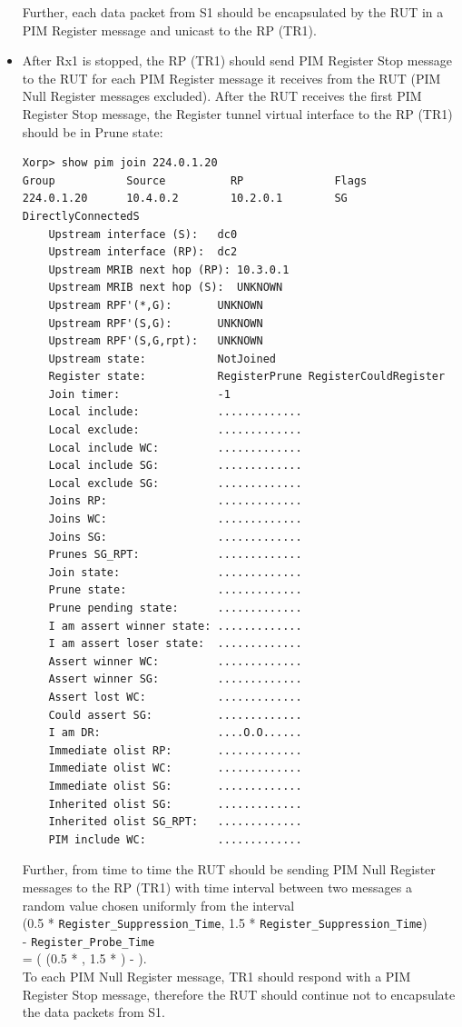 \documentclass[11pt]{report}
\begin{document}
\begin{itemize}
  Further, each data packet from S1 should be encapsulated by the RUT in a
  PIM Register message and unicast to the RP (TR1).

  \item After Rx1 is stopped, the RP (TR1) should send PIM Register Stop
  message to the RUT for each PIM Register message it receives from the RUT
  (PIM Null Register messages excluded). After the RUT receives the first
  PIM Register Stop message, the Register tunnel virtual interface to the RP
  (TR1) should be in Prune state:

\begin{verbatim}
Xorp> show pim join 224.0.1.20
Group           Source          RP              Flags
224.0.1.20      10.4.0.2        10.2.0.1        SG DirectlyConnectedS 
    Upstream interface (S):   dc0
    Upstream interface (RP):  dc2
    Upstream MRIB next hop (RP): 10.3.0.1
    Upstream MRIB next hop (S):  UNKNOWN
    Upstream RPF'(*,G):       UNKNOWN
    Upstream RPF'(S,G):       UNKNOWN
    Upstream RPF'(S,G,rpt):   UNKNOWN
    Upstream state:           NotJoined 
    Register state:           RegisterPrune RegisterCouldRegister 
    Join timer:               -1
    Local include:            .............
    Local exclude:            .............
    Local include WC:         .............
    Local include SG:         .............
    Local exclude SG:         .............
    Joins RP:                 .............
    Joins WC:                 .............
    Joins SG:                 .............
    Prunes SG_RPT:            .............
    Join state:               .............
    Prune state:              .............
    Prune pending state:      .............
    I am assert winner state: .............
    I am assert loser state:  .............
    Assert winner WC:         .............
    Assert winner SG:         .............
    Assert lost WC:           .............
    Could assert SG:          .............
    I am DR:                  ....O.O......
    Immediate olist RP:       .............
    Immediate olist WC:       .............
    Immediate olist SG:       .............
    Inherited olist SG:       .............
    Inherited olist SG_RPT:   .............
    PIM include WC:           .............
\end{verbatim}

  Further, from time to time the RUT should be sending PIM Null Register
  messages to the RP (TR1) with time interval between two messages a random
  value chosen uniformly from the interval \\
  (0.5 * \verb=Register_Suppression_Time=,
  1.5 * \verb=Register_Suppression_Time=) \\
  - \verb=Register_Probe_Time= \\
  = ( (0.5 * {\PimsmRegisterSuppressionTime}, 1.5 *
  {\PimsmRegisterSuppressionTime}) - {\PimsmRegisterProbeTime} ).\\
  To each PIM Null Register message, TR1 should respond with a PIM Register
  Stop message, therefore the RUT should continue not to encapsulate the data
  packets from S1.


\end{itemize}
\end{document}
